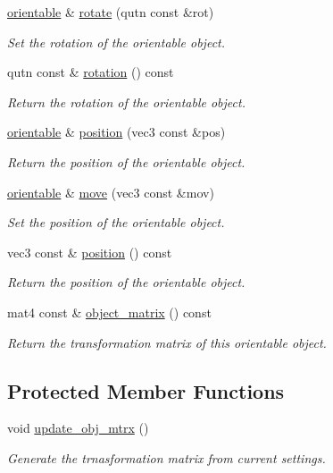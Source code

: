 \begin{DoxyCompactItemize}
\item 
\hyperlink{classgfx_1_1orientable}{orientable} \& \hyperlink{classgfx_1_1orientable_a5c66e5f024408cdf71153bfbc444d7f3}{rotate} (qutn const \&rot)
\begin{DoxyCompactList}\small\item\em Set the rotation of the orientable object. \end{DoxyCompactList}\item 
qutn const \& \hyperlink{classgfx_1_1orientable_a8e7131168074ee2d76d83313c883fe76}{rotation} () const 
\begin{DoxyCompactList}\small\item\em Return the rotation of the orientable object. \end{DoxyCompactList}\item 
\hyperlink{classgfx_1_1orientable}{orientable} \& \hyperlink{classgfx_1_1orientable_a34690e36f7c1623db703903b26ef5239}{position} (vec3 const \&pos)
\begin{DoxyCompactList}\small\item\em Return the position of the orientable object. \end{DoxyCompactList}\item 
\hyperlink{classgfx_1_1orientable}{orientable} \& \hyperlink{classgfx_1_1orientable_ac9221e15f972b8c2ba4e530cc8be4535}{move} (vec3 const \&mov)
\begin{DoxyCompactList}\small\item\em Set the position of the orientable object. \end{DoxyCompactList}\item 
vec3 const \& \hyperlink{classgfx_1_1orientable_aae8b96c0c3a5b5f86c622c7687616644}{position} () const 
\begin{DoxyCompactList}\small\item\em Return the position of the orientable object. \end{DoxyCompactList}\item 
mat4 const \& \hyperlink{classgfx_1_1orientable_a775c3fac31386a99802c2d3169ae8481}{object\-\_\-matrix} () const 
\begin{DoxyCompactList}\small\item\em Return the transformation matrix of this orientable object. \end{DoxyCompactList}\end{DoxyCompactItemize}
\subsection*{Protected Member Functions}
\begin{DoxyCompactItemize}
\item 
\hypertarget{classgfx_1_1orientable_ac49e3e938ffb892a8c55e7cb88d8bbe0}{void \hyperlink{classgfx_1_1orientable_ac49e3e938ffb892a8c55e7cb88d8bbe0}{update\-\_\-obj\-\_\-mtrx} ()}\label{classgfx_1_1orientable_ac49e3e938ffb892a8c55e7cb88d8bbe0}

\begin{DoxyCompactList}\small\item\em Generate the trnasformation matrix from current settings. \end{DoxyCompactList}\end{DoxyCompactItemize}
